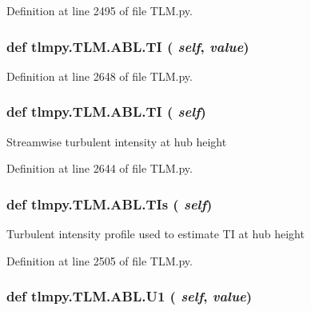 Definition at line 2495 of file TLM.py.\hypertarget{classtlmpy_1_1TLM_1_1ABL_ae34a55d43d86c613eab3961db3eabc45}{
\subsubsection[{TI}]{\setlength{\rightskip}{0pt plus 5cm}def tlmpy.TLM.ABL.TI ( {\em self}, \/   {\em value})}}
\label{classtlmpy_1_1TLM_1_1ABL_ae34a55d43d86c613eab3961db3eabc45}


Definition at line 2648 of file TLM.py.\hypertarget{classtlmpy_1_1TLM_1_1ABL_ae34a55d43d86c613eab3961db3eabc45}{
\subsubsection[{TI}]{\setlength{\rightskip}{0pt plus 5cm}def tlmpy.TLM.ABL.TI ( {\em self})}}
\label{classtlmpy_1_1TLM_1_1ABL_ae34a55d43d86c613eab3961db3eabc45}
\begin{DoxyVerb}Streamwise turbulent intensity at hub height\end{DoxyVerb}
 

Definition at line 2644 of file TLM.py.\hypertarget{classtlmpy_1_1TLM_1_1ABL_ab0c296cb8f23384d5105abce8ed17a57}{
\subsubsection[{TIs}]{\setlength{\rightskip}{0pt plus 5cm}def tlmpy.TLM.ABL.TIs ( {\em self})}}
\label{classtlmpy_1_1TLM_1_1ABL_ab0c296cb8f23384d5105abce8ed17a57}
\begin{DoxyVerb}Turbulent intensity profile used to estimate
TI at hub height\end{DoxyVerb}
 

Definition at line 2505 of file TLM.py.\hypertarget{classtlmpy_1_1TLM_1_1ABL_adbc1b210064c688a2dcafdf0fc30f78a}{
\subsubsection[{U1}]{\setlength{\rightskip}{0pt plus 5cm}def tlmpy.TLM.ABL.U1 ( {\em self}, \/   {\em value})}}
\label{classtlmpy_1_1TLM_1_1ABL_adbc1b210064c688a2dcafdf0fc30f78a}



